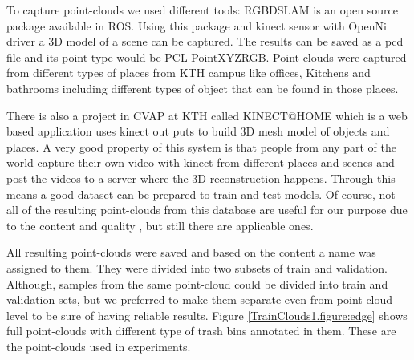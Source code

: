To capture point-clouds we used different tools:
RGBDSLAM \cite{RGBDSLAM} is an open source  package available in ROS. Using this package and kinect sensor with OpenNi 
driver a 3D model of a scene can be captured. 
The results can be saved as a pcd file and its point type would be PCL PointXYZRGB.
Point-clouds were captured from different types of places from KTH campus like offices, Kitchens and bathrooms including 
different types of object that can be found in those places.

There is also a project in CVAP at KTH called KINECT@HOME \cite{aydemir2012kinect} which is a web based application uses
kinect out puts to build 3D mesh model of objects and places. 
A very good property of this system is that people from any part of the world capture their own video with kinect from different 
places and scenes and post the videos to a server where the 3D reconstruction happens. 
Through this means a good dataset can be prepared to train and test models.
Of course, not all of the resulting point-clouds from this database are useful for our purpose due to the content and quality
, but still there are applicable ones.


All resulting point-clouds were saved and based on the content a name was assigned to them. 
They were divided into two subsets of train and validation. 
Although, samples from the same point-cloud could be divided into train and validation sets, but we preferred to make them separate 
even from point-cloud level to be sure of having reliable results. 
Figure \ref{TrainClouds1.figure:edge} shows full point-clouds with different type of trash bins annotated in them. 
These are the point-clouds used in experiments.


